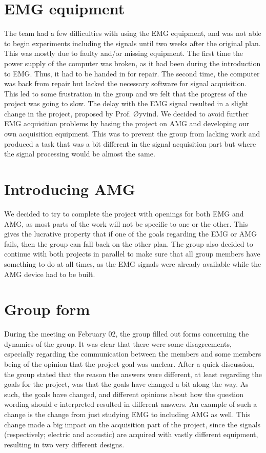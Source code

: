 \section{EMG equipment}
The team had a few difficulties with using the EMG equipment, and was not able to begin experiments including the signals until two weeks after the original plan.
This was mostly due to faulty and/or missing equipment.
The first time the power supply of the computer was broken, as it had been during the introduction to EMG.
Thus, it had to be handed in for repair.
The second time, the computer was back from repair but lacked the necessary software for signal acquisition.
This led to some frustration in the group and we felt that the progress of the project was going to slow.
The delay with the EMG signal resulted in a slight change in the project, proposed by Prof. Øyvind.
We decided to avoid further EMG acquisition problems by basing the project on AMG and developing our own acquisition equipment.
This was to prevent the group from lacking work and produced a task that was a bit different in the signal acquisition part but where the signal processing would be almost the same.

\section{Introducing AMG}
We decided to try to complete the project with openings for both EMG and AMG, as most parts of the work will not be specific to one or the other.
This gives the lucrative property that if one of the goals regarding the EMG or AMG fails, then the group can fall back on the other plan.
The group also decided to continue with both projects in parallel to make sure that all group members have something to do at all times, as the EMG signals were already available while the AMG device had to be built.

\section{Group form}
During the meeting on February 02, the group filled out forms concerning the dynamics of the group.
It was clear that there were some disagreements, especially regarding the communication between the members and some members being of the opinion that the project goal was unclear.
After a quick discussion, the group stated that the reason the answers were different, at least regarding the goals for the project, was that the goals have changed a bit along the way.
As such, the goals have changed, and different opinions about how the question wording should e interpreted resulted in different answers.
An example of such a change is the change from just studying EMG to including AMG as well.
This change made a big impact on the acquisition part of the project, since the signals (respectively; electric and acoustic) are acquired with vastly different equipment, resulting in two very different designs.

